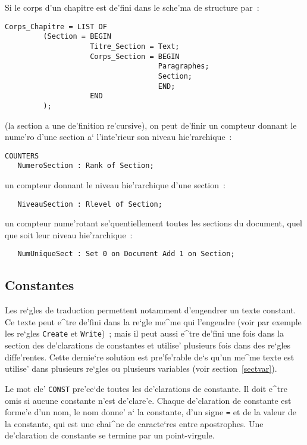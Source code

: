 {\begin{example}
Si le corps d'un chapitre est de'fini dans le sche'ma de structure par~:
\begin{verbatim}
Corps_Chapitre = LIST OF
         (Section = BEGIN
                    Titre_Section = Text;
                    Corps_Section = BEGIN
                                    Paragraphes;
                                    Section;
                                    END;
                    END
         );
\end{verbatim}
(la section a une de'finition re'cursive), on peut de'finir un compteur
donnant le nume'ro d'une section a` l'inte'rieur son niveau hie'rarchique~:
\begin{verbatim}
COUNTERS
   NumeroSection : Rank of Section;
\end{verbatim}
\label{numsect}
un compteur donnant le niveau hie'rarchique d'une section~:
\begin{verbatim}
   NiveauSection : Rlevel of Section;
\end{verbatim}
un compteur nume'rotant se'quentiellement toutes les sections du document,
quel que soit leur niveau hie'rarchique~:
\begin{verbatim}
   NumUniqueSect : Set 0 on Document Add 1 on Section;
\end{verbatim}
\label{numunique}
\end{example}

\subsection{Constantes}

Les re`gles de traduction permettent notamment d'engendrer un texte constant.
Ce texte peut e^tre de'fini dans la re`gle me^me qui l'engendre (voir par
exemple les re`gles {\tt Create} et {\tt Write})~; mais il peut aussi e^tre
de'fini une fois dans la section des de'clarations de constantes et utilise'
plusieurs fois dans des re`gles diffe'rentes. Cette dernie`re solution est
pre'fe'rable de`s qu'un me^me texte est utilise' dans plusieurs re`gles ou
plusieurs variables (voir section~\ref{sectvar}).

Le mot cle' {\tt CONST} pre'ce`de toutes les de'clarations de constante.
Il doit e^tre omis si aucune constante n'est de'clare'e. Chaque de'claration
de constante est forme'e d'un nom, le nom donne' a` la constante, d'un signe
{\tt =} et de la valeur de la constante, qui est une chai^ne de caracte`res
entre apostrophes. Une de'claration de constante se termine par un
point-virgule.

}
